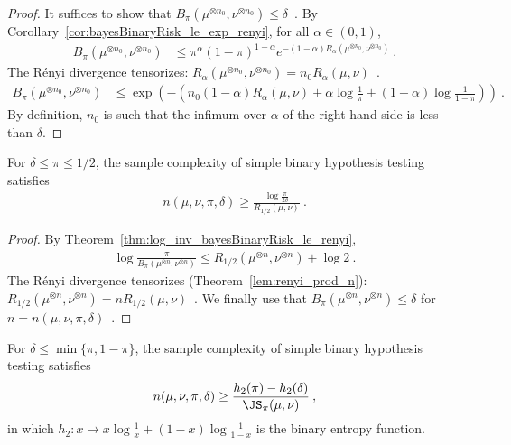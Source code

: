 \begin{proof}%
{}
It suffices to show that $B_\pi(\mu^{\otimes n_0}, \nu^{\otimes n_0}) \le \delta$~.
By Corollary~\ref{cor:bayesBinaryRisk_le_exp_renyi}, for all $\alpha \in (0,1)$,
\begin{align*}
B_\pi(\mu^{\otimes n_0}, \nu^{\otimes n_0})
&\le \pi^{\alpha} (1 - \pi)^{1 - \alpha}e^{- (1 - \alpha)R_\alpha(\mu^{\otimes n_0}, \nu^{\otimes n_0})}
\: .
\end{align*}
The Rényi divergence tensorizes: $R_\alpha(\mu^{\otimes n_0}, \nu^{\otimes n_0}) = n_0 R_\alpha(\mu, \nu)$~.
\begin{align*}
B_\pi(\mu^{\otimes n_0}, \nu^{\otimes n_0})
&\le \exp\left(- \left( n_0 (1 - \alpha)R_\alpha(\mu, \nu) + \alpha\log\frac{1}{\pi} + (1 - \alpha)\log\frac{1}{1 - \pi} \right) \right)
\: .
\end{align*}
By definition, $n_0$ is such that the infimum over $\alpha$ of the right hand side is less than $\delta$.
\end{proof}


\begin{lemma}
  \label{lem:binaryPriorSampleComplexity_ge_renyi}
  For $\delta \le \pi \le 1/2$, the sample complexity of simple binary hypothesis testing satisfies
  \begin{align*}
  n(\mu, \nu, \pi, \delta) \ge \frac{\log\frac{\pi}{2\delta}}{R_{1/2}(\mu, \nu)}
  \: .
  \end{align*}
\end{lemma}

\begin{proof}%
{}
By Theorem~\ref{thm:log_inv_bayesBinaryRisk_le_renyi},
\begin{align*}
\log\frac{\pi}{B_\pi(\mu^{\otimes n}, \nu^{\otimes n})} \le R_{1/2}(\mu^{\otimes n}, \nu^{\otimes n}) + \log 2
\: .
\end{align*}
The Rényi divergence tensorizes (Theorem~\ref{lem:renyi_prod_n}): $R_{1/2}(\mu^{\otimes n}, \nu^{\otimes n}) = n R_{1/2}(\mu, \nu)$~.
We finally use that $B_\pi(\mu^{\otimes n}, \nu^{\otimes n}) \le \delta$ for $n = n(\mu, \nu, \pi, \delta)$~.
\end{proof}


\begin{lemma}
  \label{lem:binaryPriorSampleComplexity_ge_jensenShannon}
  For $\delta \le \min\{\pi, 1 - \pi\}$, the sample complexity of simple binary hypothesis testing satisfies
  \begin{align*}
  n(\mu, \nu, \pi, \delta) \ge \frac{h_2(\pi) - h_2(\delta)}{\JS_\pi(\mu, \nu)}
  \: ,
  \end{align*}
  in which $h_2: x \mapsto x\log\frac{1}{x} + (1 - x)\log\frac{1}{1 - x}$ is the binary entropy function.
\end{lemma}

